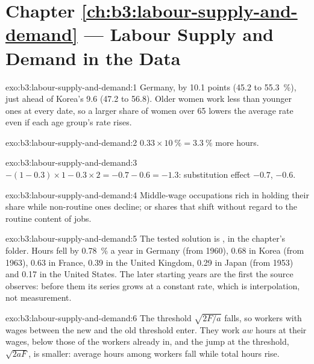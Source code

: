 \section*{Chapter \ref{ch:b3:labour-supply-and-demand} --- Labour Supply and Demand in the Data}

\begin{solution}{exo:b3:labour-supply-and-demand:1}
Germany, by 10.1 points (45.2 to 55.3~\%), just ahead of Korea's 9.6 (47.2 to 56.8). %
Older women work less than younger ones at every date, so a larger share of women
over 65 lowers the average rate even if each age group's rate rises.
\end{solution}

\begin{solution}{exo:b3:labour-supply-and-demand:2}
$0.33 \times 10~\% = 3.3~\%$ more hours.
\end{solution}

\begin{solution}{exo:b3:labour-supply-and-demand:3}
$-(1 - 0.3) \times 1 - 0.3 \times 2 = -0.7 - 0.6 = -1.3$: substitution effect $-0.7$,  $-0.6$.
\end{solution}

\begin{solution}{exo:b3:labour-supply-and-demand:4}
Middle-wage occupations rich in  holding their share while
non-routine ones decline; or shares that shift without regard to the routine
content of jobs.
\end{solution}

\begin{solution}{exo:b3:labour-supply-and-demand:5}
The tested solution is , in the chapter's  folder.
Hours fell by 0.78~\% a year in Germany (from 1960), 0.68 in Korea (from 1963), 0.63 in France,
0.39 in the United Kingdom, 0.29 in Japan (from 1953) and 0.17 in the United States. The
later starting years are the first the source observes: before them its series grows at
a constant rate, which is interpolation, not measurement. %
\end{solution}

\begin{solution}{exo:b3:labour-supply-and-demand:6}
The threshold $\sqrt{2F/a}$ falls, so workers with wages between the new and the old
threshold enter. They work $aw$ hours at their wages, below those of the workers already
in, and the jump at the threshold, $\sqrt{2aF}$, is smaller: average hours among workers fall
while total hours rise.
\end{solution}

